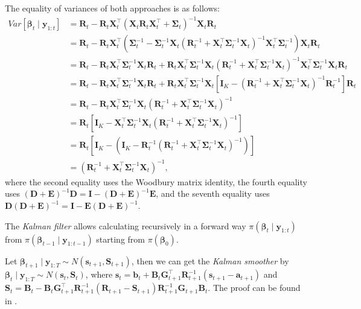 The equality of variances of both approaches is as follows:
\begin{align*}
	Var[\bm{\beta}_t\mid \bm{y}_{1:t}]&
	= \bm{R}_{t}-\bm{R}_{t}\bm{X}_t^{\top}(\bm{X}_t\bm{R}_{t}\bm{X}_t^\top+\bm{\Sigma}_t)^{-1} \bm{X}_t\bm{R}_{t}\\
	&=\bm{R}_{t}-\bm{R}_{t}\bm{X}_t^{\top}(\bm{\Sigma}_t^{-1}- \bm{\Sigma}_t^{-1}\bm{X}_t(\bm{R}_{t}^{-1}+\bm{X}_t^{\top}\bm{\Sigma}_t^{-1}\bm{X}_t)^{-1}\bm{X}_t^{\top}\bm{\Sigma}_t^{-1})\bm{X}_t\bm{R}_{t}\\
	&=\bm{R}_{t}-\bm{R}_{t}\bm{X}_t^{\top}\bm{\Sigma}_t^{-1}\bm{X}_t\bm{R}_{t}+ \bm{R}_{t}\bm{X}_t^{\top}\bm{\Sigma}_t^{-1}\bm{X}_t(\bm{R}_{t}^{-1}+\bm{X}_t^{\top}\bm{\Sigma}_t^{-1}\bm{X}_t)^{-1}\bm{X}_t^{\top}\bm{\Sigma}_t^{-1}\bm{X}_t\bm{R}_{t}\\
	&=\bm{R}_{t}-\bm{R}_{t}\bm{X}_t^{\top}\bm{\Sigma}_t^{-1}\bm{X}_t\bm{R}_{t}+ \bm{R}_{t}\bm{X}_t^{\top}\bm{\Sigma}_t^{-1}\bm{X}_t[\bm{I}_K-(\bm{R}_{t}^{-1}+\bm{X}_t^{\top}\bm{\Sigma}_t^{-1}\bm{X}_t)^{-1}\bm{R}_{t}^{-1}]\bm{R}_{t}\\
	&=\bm{R}_{t}-\bm{R}_{t}\bm{X}_t^{\top}\bm{\Sigma}_t^{-1}\bm{X}_t(\bm{R}_{t}^{-1}+\bm{X}_t^{\top}\bm{\Sigma}_t^{-1}\bm{X}_t)^{-1}\\
	&=\bm{R}_t[\bm{I}_K-\bm{X}_t^{\top}\bm{\Sigma}_t^{-1}\bm{X}_t(\bm{R}_{t}^{-1}+\bm{X}_t^{\top}\bm{\Sigma}_t^{-1}\bm{X}_t)^{-1}]\\
	&=\bm{R}_{t}[\bm{I}_K-(\bm{I}_K-\bm{R}_{t}^{-1}(\bm{R}_{t}^{-1}+\bm{X}_t^{\top}\bm{\Sigma}_t^{-1}\bm{X}_t)^{-1})]\\
	&=(\bm{R}_{t}^{-1}+\bm{X}_t^{\top}\bm{\Sigma}_t^{-1}\bm{X}_t)^{-1},
\end{align*}
where the second equality uses the Woodbury matrix identity, the fourth equality uses $(\bm{D}+\bm{E})^{-1}\bm{D}=\bm{I}-(\bm{D}+\bm{E})^{-1}\bm{E}$, and the seventh equality uses $\bm{D}(\bm{D}+\bm{E})^{-1}=\bm{I}-\bm{E}(\bm{D}+\bm{E})^{-1}$.  

The \textit{Kalman filter} allows calculating recursively in a forward way $\pi(\bm{\beta}_t\mid \bm{y}_{1:t})$ from $\pi(\bm{\beta}_{t-1}\mid \bm{y}_{1:t-1})$ starting from $\pi(\bm{\beta}_0)$.

Let $\bm{\beta}_{t+1}\mid \bm{y}_{1:T}\sim N(\bm{s}_{t+1},\bm{S}_{t+1})$, then we can get the \textit{Kalman smoother} by $\bm{\beta}_{t}\mid \bm{y}_{1:T}\sim N(\bm{s}_{t},\bm{S}_{t})$, where $\bm{s}_t=\bm{b}_t+\bm{B}_t\bm{G}_{t+1}^{\top}\bm{R}_{t+1}^{-1}(\bm{s}_{t+1}-\bm{a}_{t+1})$ and $\bm{S}_t=\bm{B}_t-\bm{B}_t\bm{G}_{t+1}^{\top}\bm{R}_{t+1}^{-1}(\bm{R}_{t+1}-\bm{S}_{t+1})\bm{R}_{t+1}^{-1}\bm{G}_{t+1}\bm{B}_{t}$. The proof can be found in \cite[Chap~2]{petris2009dynamic}. 

